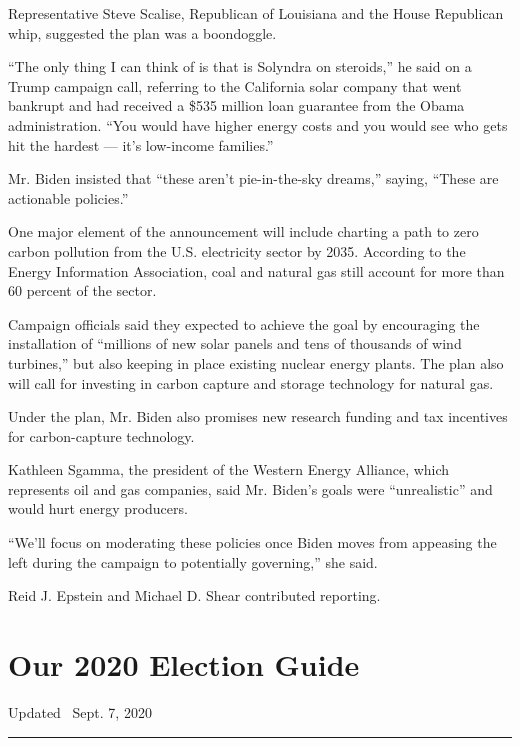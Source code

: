 Representative Steve Scalise, Republican of Louisiana and the House
Republican whip, suggested the plan was a boondoggle.

``The only thing I can think of is that is Solyndra on steroids,'' he
said on a Trump campaign call, referring to the California solar company
that went bankrupt and had received a \$535 million loan guarantee from
the Obama administration. ``You would have higher energy costs and you
would see who gets hit the hardest --- it's low-income families.''

Mr. Biden insisted that ``these aren't pie-in-the-sky dreams,'' saying,
``These are actionable policies.''

One major element of the announcement will include charting a path to
zero carbon pollution from the U.S. electricity sector by 2035.
According to the Energy Information Association, coal and natural gas
still account for more than 60 percent of the sector.

Campaign officials said they expected to achieve the goal by encouraging
the installation of ``millions of new solar panels and tens of thousands
of wind turbines,'' but also keeping in place existing nuclear energy
plants. The plan also will call for investing in carbon capture and
storage technology for natural gas.

Under the plan, Mr. Biden also promises new research funding and tax
incentives for carbon-capture technology.

Kathleen Sgamma, the president of the Western Energy Alliance, which
represents oil and gas companies, said Mr. Biden's goals were
``unrealistic'' and would hurt energy producers.

``We'll focus on moderating these policies once Biden moves from
appeasing the left during the campaign to potentially governing,'' she
said.

Reid J. Epstein and Michael D. Shear contributed reporting.

\hypertarget{our-2020-election-guide}{%
\section{Our 2020 Election Guide}\label{our-2020-election-guide}}

Updated ~Sept. 7, 2020

\begin{center}\rule{0.5\linewidth}{\linethickness}\end{center}

